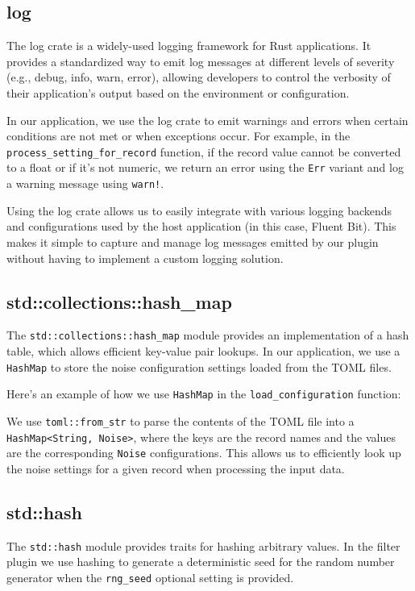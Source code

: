 \subsection{log}
The log crate is a widely-used logging framework for Rust applications. It provides a standardized way to emit log messages at different levels of severity (e.g., debug, info, warn, error), allowing developers to control the verbosity of their application's output based on the environment or configuration.

In our application, we use the log crate to emit warnings and errors when certain conditions are not met or when exceptions occur. For example, in the \texttt{process\_setting\_for\_record} function, if the record value cannot be converted to a float or if it's not numeric, we return an error using the \texttt{Err} variant and log a warning message using \texttt{warn!}.

Using the log crate allows us to easily integrate with various logging backends and configurations used by the host application (in this case, Fluent Bit). This makes it simple to capture and manage log messages emitted by our plugin without having to implement a custom logging solution.

\subsection{std::collections::hash\_map}
The \texttt{std::collections::hash\_map} module provides an implementation of a hash table, which allows efficient key-value pair lookups. In our application, we use a \texttt{HashMap} to store the noise configuration settings loaded from the TOML files.

Here's an example of how we use \texttt{HashMap} in the \texttt{load\_configuration} function:



We use \texttt{toml::from\_str} to parse the contents of the TOML file into a \texttt{HashMap<String, Noise>}, where the keys are the record names and the values are the corresponding \texttt{Noise} configurations. This allows us to efficiently look up the noise settings for a given record when processing the input data.

\subsection{std::hash}
The \texttt{std::hash} module provides traits for hashing arbitrary values. In the filter plugin we use hashing to generate a deterministic seed for the random number generator when the \texttt{rng\_seed} optional setting is provided.

